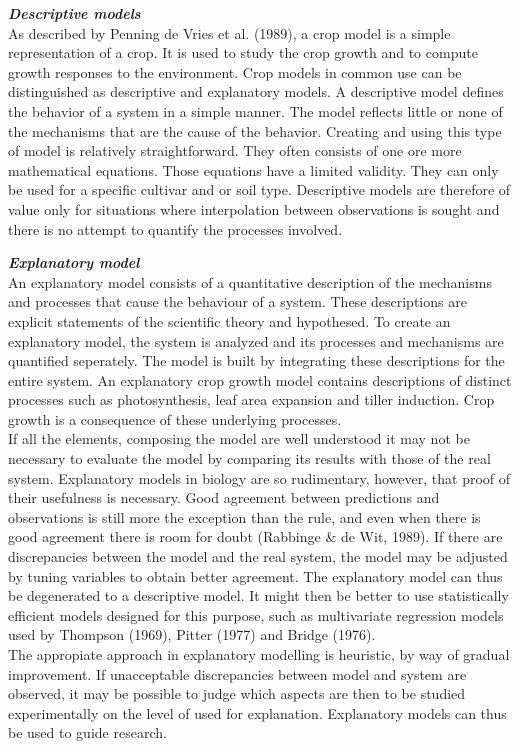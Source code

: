 \documentclass[11pt]{article}
\begin{document}
\bigskip
{\bf {\it Descriptive models\/}}\\
As described by Penning de Vries et al. (1989), a crop model is a simple representa\-tion of a crop. It is used to study the crop growth and to compute growth responses
to the environment. Crop models in common use can be distin\-guished as descriptive
and explanatory models. A descriptive model defines the behavior of a system in a
simple manner. The model reflects little or none of the mechanisms that are the
cause of the behavior. Creating and using this type of model is relatively straightfor\-ward. They often consists of one ore more mathematical equations. Those equations
have a limited validity. They can only be used for a specific cultivar and or soil type.
Descriptive models are therefore of value only for situations where interpolation
between observations is sought and there is no attempt to quantify the processes
involved.

\bigskip
{\bf {\it Explanatory model\/}}\\
An explanatory model consists of a quantitative description of the mechanisms and
processes that cause the behaviour of a system. These descriptions are explicit
statements of the scientific theory and hypothesed. To create an explanatory model,
the system is analyzed and its processes and mechanisms are quantified seperately.
The model is built by integrating these descriptions for the entire system. An
explanatory crop growth model contains descriptions of distinct processes such as
photosynthesis, leaf area expansion and tiller induction. Crop growth is a conse\-quence of these underlying processes.\\
If all the elements, composing the model are well understood it may not be necessary
to evaluate the model by comparing its results with those of the real system. Explana\-tory models in biology are so rudimentary, however, that proof of their usefulness is
necessary. Good agreement between predictions and observations is still more the
exception than the rule, and even when there is good agreement there is room for
doubt (Rabbinge \& de Wit, 1989). If there are discrepancies between the model and
the real system, the model may be adjusted by tuning variables to obtain better
agreement. The explanatory model can thus be degenerated to a descriptive model. It
might then be better to use statistically efficient models designed for this purpose,
such as multivariate regression models used by Thompson (1969), Pitter (1977) and
Bridge (1976).\\
The appropiate approach in explanatory modelling is heuristic, by way of gradual
improvement. If unacceptable discrepancies between model and system are observed,
it may be possible to judge which aspects are then to be studied experimentally on
the level of used for explanation. Explanatory models can thus be used to guide
research.
\end{document}
